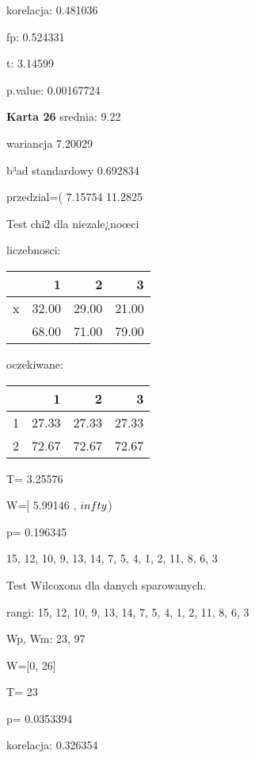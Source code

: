 \documentclass[a4paper,12pt]{article}
\begin{document}
\begin{multicols}{3}
  korelacja: 0.481036
     
     fp: 0.524331
     
     t: 3.14599
     
     p.value: 0.00167724 \vspace{1cm} 

  \textbf{Karta  26 } 
 srednia: 9.22 
     
     wariancja 7.20029  
     
     b³ad standardowy 0.692834 
     
     przedzial=( 7.15754 11.2825 \vspace{1cm} 

  Test chi2 dla niezale¿noœci 
   
   liczebnosci: %
\begin{tabular}{rrrr}
  \hline
 & 1 & 2 & 3 \\
  \hline
x & 32.00 & 29.00 & 21.00 \\
   & 68.00 & 71.00 & 79.00 \\
   \hline
\end{tabular}
 
   
   oczekiwane: %
\begin{tabular}{rrrr}
  \hline
 & 1 & 2 & 3 \\
  \hline
1 & 27.33 & 27.33 & 27.33 \\
  2 & 72.67 & 72.67 & 72.67 \\
   \hline
\end{tabular}
 
   
   T= 3.25576 
   
   W=[ 5.99146 , $\\infty$) 
   
   p= 0.196345 \vspace{1cm} 

  15, 12, 10, 9, 13, 14, 7, 5, 4, 1, 2, 11, 8, 6, 3 

  Test Wilcoxona dla danych sparowanych. 
  
  rangi: 15, 12, 10, 9, 13, 14, 7, 5, 4, 1, 2, 11, 8, 6, 3 
  
  Wp, Wm:  23,  97 
  
  W=[0, 26]  
  
  T=  23 
  
  p= 0.0353394 \vspace{1cm} 

  korelacja: 0.326354
     

\end{multicols}
\end{document}
